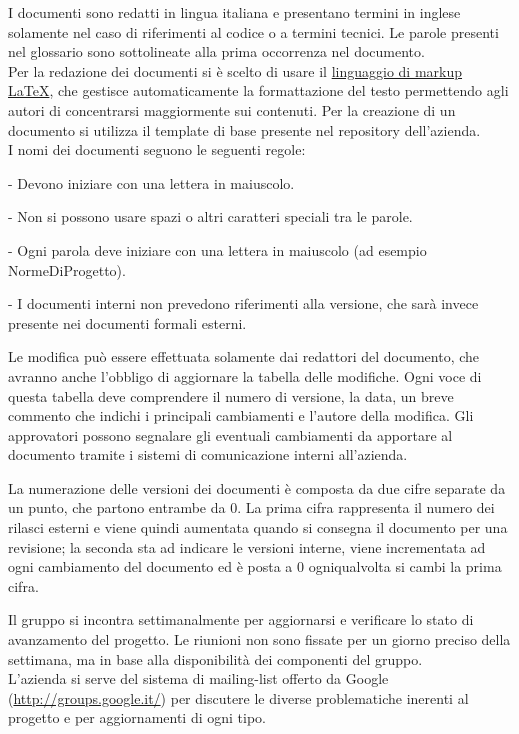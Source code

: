   I documenti sono redatti in lingua italiana e presentano termini in inglese solamente nel caso di riferimenti al codice o a termini tecnici. Le parole presenti nel glossario sono sottolineate alla prima occorrenza nel documento.\\
  Per la redazione dei documenti si \`e scelto di usare il \underline{linguaggio di markup} \underline{\LaTeX}, che gestisce automaticamente la formattazione del testo permettendo agli autori di concentrarsi maggiormente sui contenuti. Per la creazione di un documento si utilizza il template di base presente nel repository dell'azienda.\\
  I nomi dei documenti seguono le seguenti regole:
  \begin{elencopuntato}[\normindent]
    \item[-] Devono iniziare con una lettera in maiuscolo.
    \item[-] Non si possono usare spazi o altri caratteri speciali tra le parole.
    \item[-] Ogni parola deve iniziare con una lettera in maiuscolo (ad esempio NormeDiProgetto).
    \item[-] I documenti interni non prevedono riferimenti alla versione, che sar\`a invece presente nei documenti formali esterni.
  \end{elencopuntato}
  
  Le modifica pu\`o essere effettuata solamente dai redattori del documento, che avranno anche l'obbligo di aggiornare la tabella delle modifiche. Ogni voce di questa tabella deve comprendere il numero di versione, la data, un breve commento che indichi i principali cambiamenti e l'autore della modifica.
  Gli approvatori possono segnalare gli eventuali cambiamenti da apportare al documento tramite i sistemi di comunicazione interni all'azienda.
  
  La numerazione delle versioni dei documenti \`e composta da due cifre separate da un punto, che partono entrambe da 0. La prima cifra rappresenta il numero dei rilasci esterni e viene quindi aumentata quando si consegna il documento per una revisione; la seconda sta ad indicare le versioni interne, viene incrementata ad ogni cambiamento del documento ed \`e posta a 0 ogniqualvolta si cambi la prima cifra.
 
Il gruppo si incontra settimanalmente per aggiornarsi e verificare lo stato di avanzamento del progetto. Le riunioni non sono fissate per un giorno preciso della settimana, ma in base alla disponibilit\`a dei componenti del gruppo.\\
L'azienda si serve del sistema di mailing-list offerto da Google (\href{http://groups.google.it/}{http://groups.google.it/}) per discutere le diverse problematiche inerenti al progetto e per aggiornamenti di ogni tipo.
 
